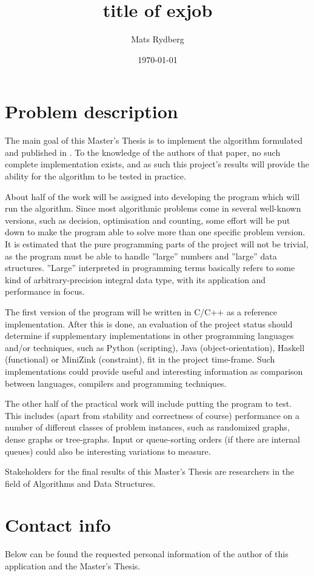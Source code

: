 \documentclass[a4paper, titlepage]{article}
\title{\huge{title of exjob}}
\author{Mats Rydberg}
\date{\today}
\begin{document}
\maketitle

\section*{Problem description}
The main goal of this Master's Thesis is to implement the algorithm formulated and published in \cite{covering}. To the knowledge of the authors of that paper, no such complete implementation exists, and as such this project's results will provide the ability for the algorithm to be tested in practice.

About half of the work will be assigned into developing the program which will run the algorithm. Since most algorithmic problems come in several well-known versions, such as decision, optimisation and counting, some effort will be put down to make the program able to solve more than one specific problem version. It is estimated that the pure programming parts of the project will not be trivial, as the program must be able to handle ''large'' numbers and ''large'' data structures. ''Large'' interpreted in programming terms basically refers to some kind of arbitrary-precision integral data type, with its application and performance in focus. 

The first version of the program will be written in C/C++ as a reference implementation. After this is done, an evaluation of the project status should determine if supplementary implementations in other programming languages and/or techniques, such as Python (scripting), Java (object-orientation), Haskell (functional) or MiniZink (constraint), fit in the project time-frame. Such implementations could provide useful and interesting information as comparison between languages, compilers and programming techniques.

The other half of the practical work will include putting the program to test. This includes (apart from stability and correctness of course) performance on a number of different classes of problem instances, such as randomized graphs, dense graphs or tree-graphs. Input or queue-sorting orders (if there are internal queues) could also be interesting variations to measure.

Stakeholders for the final results of this Master's Thesis are researchers in the field of Algorithms and Data Structures.

\section*{Contact info}
Below can be found the requested personal information of the author of this application and the Master's Thesis.
\\
\end{document}
